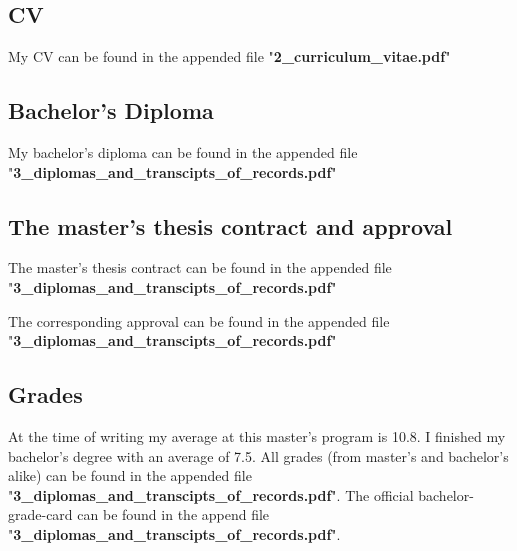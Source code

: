 \documentclass[a4paper]{article}
\begin{document}
\pagebreak
\subsection{CV}

My CV can be found in the appended file "\textbf{2\_curriculum\_vitae.pdf}"

\subsection{Bachelor's Diploma}

My bachelor's diploma can be found in the appended file "\textbf{3\_diplomas\_and\_transcipts\_of\_records.pdf}"

\subsection{The master's thesis contract and approval}

The master's thesis contract can be found in the appended file "\textbf{3\_diplomas\_and\_transcipts\_of\_records.pdf}"\par

The corresponding approval can be found in the appended file "\textbf{3\_diplomas\_and\_transcipts\_of\_records.pdf}"

\subsection{Grades}

At the time of writing my average at this master's program is 10.8. I finished my bachelor's degree with an average of 7.5. All grades (from master's and bachelor's alike) can be found in the appended file "\textbf{3\_diplomas\_and\_transcipts\_of\_records.pdf}". The official bachelor-grade-card can be found in the append file "\textbf{3\_diplomas\_and\_transcipts\_of\_records.pdf}".\par
\end{document}
